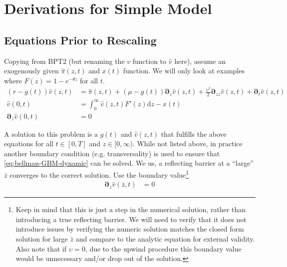 \documentclass[11pt]{article}
\newcommand{\D}[1][]{\ensuremath{\boldsymbol{\partial}_{#1}}}
\newcommand{\diff}{\ensuremath{\mathrm{d}}}
\begin{document}
\newpage
\appendix
\makeatletter
\def\@seccntformat#1{Appendix\ \csname the#1\endcsname\quad}
\makeatother
\makeatletter
\def\@seccntformat#1{\csname Pref@#1\endcsname \csname the#1\endcsname\quad}
\def\Pref@section{Appendix~}
\makeatother
{}
\section{Derivations for Simple Model}\label{sec:simple-derivation}
\subsection{Equations Prior to Rescaling}

Copying from BPT2 (but renaming the $v$ function to $\hat{v}$ here), assume an exogenously given $\hat{\pi}(z,t)$ and $x(t)$ function.  We will only look at examples where $F(z) = 1 - e^{-\theta z}$ for all $t$.
\begin{align}
(r - g(t)) \hat{v}(z,t) &= \hat{\pi}(z,t) + (\mu- g(t)) \D[z] \hat{v}(z,t) + \frac{\upsilon^2}{2} \D[zz] \hat{v}(z,t) + \D[t]\hat{v}(z,t)\label{eq:bellman-GBM-dynamic}	\\
\hat{v}(0,t) &= \int_{0}^{\infty} \hat{v}(z,t) F'(z)\diff z - x(t)\label{eq:vm-GBM-dynamic}\\
\D[z]\hat{v}(0,t) &= 0\label{eq:sp-GBM-dynamic}
\end{align}

A solution to this problem is a $g(t)$ and $\hat{v}(z,t)$ that fulfills the above equations for all $t\in[0,T]$ and $z\in[0,\infty)$.  While not listed above, in practice another boundary condition (e.g. transversality) is used to ensure that \cref{eq:bellman-GBM-dynamic} can be solved. We us, a reflecting barrier at a ``large'' $\bar{z}$ converges to the correct solution.  Use the boundary value\footnote{Keep in mind that this is just a step in the numerical solution, rather than introducing a true reflecting barrier.  We will need to verify that it does not introduce issues by verifying the numeric solution matches the closed form solution for large $\bar{z}$ and compare to the analytic equation for external validity.  Also note that if $\upsilon = 0$, due to the upwind procedure this boundary value would be unnecessary and/or drop out of the solution.}
	\begin{align}
	\D[z]\hat{v}(\bar{z},t) &= 0\label{eq:reflecting-GBM-dynamic}
	\end{align}
	
\end{document}
